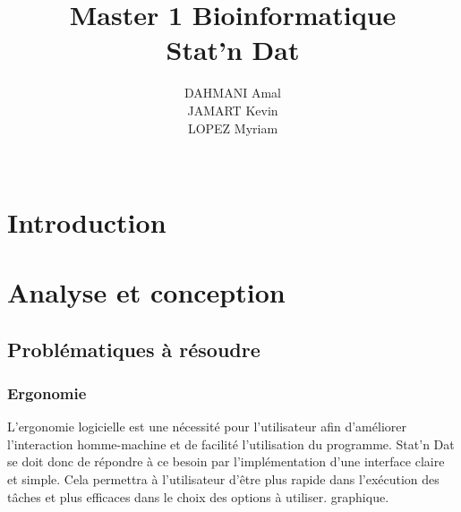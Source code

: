 \documentclass[a4paper,10pt]{report}
\title{Master 1 Bioinformatique\\Stat'n Dat}
\author{DAHMANI Amal\\JAMART Kevin\\LOPEZ Myriam\\\\}
\begin{document}
\renewcommand{\thechapter}{\Roman{chapter}} 
\renewcommand{\thesection}{\Roman{section}}
\renewcommand{\thesubsection}{\Roman{subsection}}
\renewcommand{\contentsname}{Sommaire}
\renewcommand{\thesubsubsection}{\Roman{subsubsection}}


\maketitle
\newpage
\tableofcontents
{}
\setcounter{tocdepth}{3}     %
\setcounter{secnumdepth}{3}  %


\newpage
\thispagestyle{empty}
\setcounter{page}{1}

\chapter*{Introduction}


 
\chapter{Analyse et conception}


\section{Problématiques à résoudre}


\subsection{Ergonomie}

L’ergonomie logicielle est une nécessité pour l’utilisateur afin d'améliorer l'interaction homme-machine et de facilité l’utilisation du programme. Stat’n Dat se doit donc de répondre à ce besoin par l’implémentation d’une interface claire et simple. Cela permettra à l'utilisateur d’être plus rapide dans l’exécution des tâches et plus efficaces dans le choix des options à utiliser.  graphique. 



\end{document}

